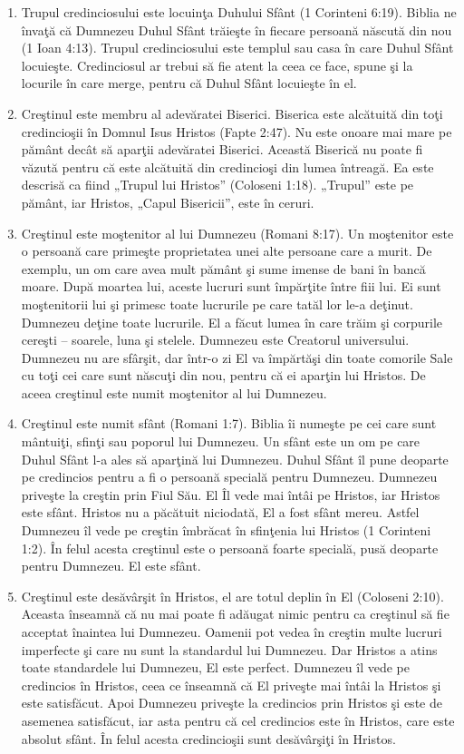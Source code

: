 \begin{enumerate}
\item Trupul credinciosului este locuinţa Duhului Sfânt (1 Corinteni 6:19). Biblia ne învaţă că Dumnezeu Duhul Sfânt trăieşte în fiecare persoană născută din nou (1 Ioan 4:13). Trupul credinciosului este templul sau casa în care Duhul Sfânt locuieşte. Credinciosul ar trebui să fie atent la ceea ce face, spune şi la locurile în care merge, pentru că Duhul Sfânt locuieşte în el. 

\item Creştinul este membru al adevăratei Biserici. Biserica este alcătuită din toţi credincioşii în Domnul Isus Hristos (Fapte 2:47). Nu este onoare mai mare pe pământ decât să aparţii adevăratei Biserici. Această Biserică nu poate fi văzută pentru că este alcătuită din credincioşi din lumea întreagă. Ea este descrisă ca fiind „Trupul lui Hristos” (Coloseni 1:18). „Trupul” este pe pământ, iar Hristos, „Capul Bisericii”, este în ceruri. 

\item Creştinul este moştenitor al lui Dumnezeu (Romani 8:17). Un moştenitor este o persoană care primeşte proprietatea unei alte persoane care a murit. De exemplu, un om care avea mult pământ şi sume imense de bani în bancă moare. După moartea lui, aceste lucruri sunt împărţite între fiii lui. Ei sunt moştenitorii lui şi primesc toate lucrurile pe care tatăl lor le-a deţinut. Dumnezeu deţine toate lucrurile. El a făcut lumea în care trăim şi corpurile cereşti – soarele, luna şi stelele. Dumnezeu este Creatorul universului. Dumnezeu nu are sfârşit, dar într-o zi El va împărtăşi din toate comorile Sale cu toţi cei care sunt născuţi din nou, pentru că ei aparţin lui Hristos. De aceea creştinul este numit moştenitor al lui Dumnezeu.

\item Creştinul este numit sfânt (Romani 1:7). Biblia îi numeşte pe cei care sunt mântuiţi, sfinţi sau poporul lui Dumnezeu. Un sfânt este un om pe care Duhul Sfânt l-a ales să aparţină lui Dumnezeu. Duhul Sfânt îl pune deoparte pe credincios pentru a fi o persoană specială pentru Dumnezeu. Dumnezeu priveşte la creştin prin Fiul Său. El Îl vede mai întâi pe Hristos, iar Hristos este sfânt. Hristos nu a păcătuit niciodată, El a fost sfânt mereu. Astfel Dumnezeu îl vede pe creştin îmbrăcat în sfinţenia lui Hristos (1 Corinteni 1:2). În felul acesta creştinul este o persoană foarte specială, pusă deoparte pentru Dumnezeu. El este sfânt. 

\item Creştinul este desăvârşit în Hristos, el are totul deplin în El (Coloseni 2:10). Aceasta înseamnă că nu mai poate fi adăugat nimic pentru ca creştinul să fie acceptat înaintea lui Dumnezeu. Oamenii pot vedea în creştin multe lucruri imperfecte şi care nu sunt la standardul lui Dumnezeu. Dar Hristos a atins toate standardele lui Dumnezeu, El este perfect. Dumnezeu îl vede pe credincios în Hristos, ceea ce înseamnă că El priveşte mai întâi la Hristos şi este satisfăcut. Apoi Dumnezeu priveşte la credincios prin Hristos şi este de asemenea satisfăcut, iar asta pentru că cel credincios este în Hristos, care este absolut sfânt. În felul acesta credincioşii sunt desăvârşiţi în Hristos.


\end{enumerate}
